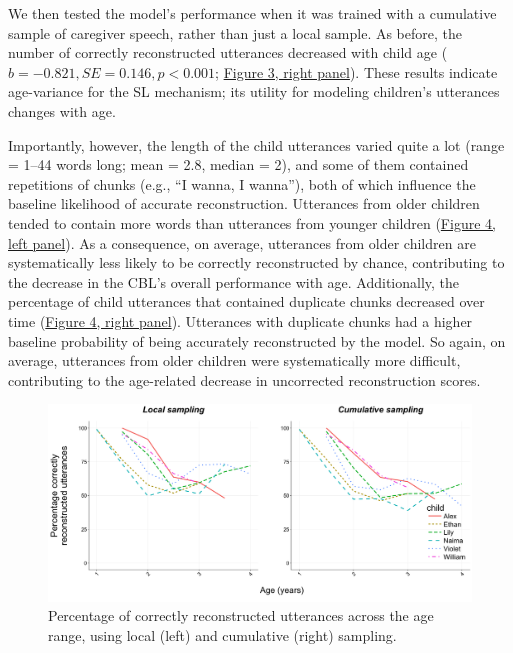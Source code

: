\documentclass[man,mask,floatsintext]{apa6}
\theoremstyle{definition}
\theoremstyle{definition}
\theoremstyle{definition}
\theoremstyle{remark}
\begin{document}
We then tested the model's performance when it was trained with a
cumulative sample of caregiver speech, rather than just a local sample.
As before, the number of correctly reconstructed utterances decreased
with child age (\(b=-0.821, SE = 0.146, p < 0.001\);
\protect\hyperlink{fig3}{Figure 3, right panel}). These results indicate
age-variance for the SL mechanism; its utility for modeling children's
utterances changes with age.

Importantly, however, the length of the child utterances varied quite a
lot (range = 1--44 words long; mean = 2.8, median = 2), and some of them
contained repetitions of chunks (e.g., \enquote{I wanna, I wanna}), both
of which influence the baseline likelihood of accurate reconstruction.
Utterances from older children tended to contain more words than
utterances from younger children (\protect\hyperlink{fig4}{Figure 4,
left panel}). As a consequence, on average, utterances from older
children are systematically less likely to be correctly reconstructed by
chance, contributing to the decrease in the CBL's overall performance
with age. Additionally, the percentage of child utterances that
contained duplicate chunks decreased over time
(\protect\hyperlink{fig4}{Figure 4, right panel}). Utterances with
duplicate chunks had a higher baseline probability of being accurately
reconstructed by the model. So again, on average, utterances from older
children were systematically more difficult, contributing to the
age-related decrease in uncorrected reconstruction scores.

\begin{figure}

{\centering \includegraphics[width=0.95\linewidth]{images/plotbothreconstruction_perc} 

}

\caption{Percentage of correctly reconstructed utterances across the age range, using local (left) and cumulative (right) sampling.}\label{fig:fig3}
\end{figure}
\end{document}
